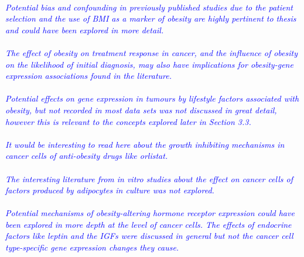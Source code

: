\documentclass[a4paper, 12pt]{article}
\begin{document}
\noindent
\\

\noindent
\textcolor{blue}{
	\textit{Potential bias and confounding in previously published studies due to the patient selection and the use of BMI as a marker of obesity are highly pertinent to thesis and could have been explored in more detail.
	}
}\\

\noindent
\\

\noindent
\textcolor{blue}{
	\textit{The effect of obesity on treatment response in cancer, and the influence of obesity on the likelihood of initial diagnosis, may also have implications for obesity-gene expression associations found in the literature.
	}
}\\

\noindent
\\

\noindent
\textcolor{blue}{
	\textit{Potential effects on gene expression in tumours by lifestyle factors associated with obesity, but not recorded in most data sets was not discussed in great detail, however this is relevant to the concepts explored later in Section 3.3.
	}
}\\

\noindent
\\

\noindent
\textcolor{blue}{
	\textit{It would be interesting to read here about the growth inhibiting mechanisms in cancer cells of anti-obesity drugs like orlistat.
	}
}\\

\noindent
\\

\noindent
\textcolor{blue}{
	\textit{The interesting literature from \textit{in vitro} studies about the effect on cancer cells of factors produced by adipocytes in culture was not explored.
	}
}\\

\noindent
\\

\noindent
\textcolor{blue}{
	\textit{Potential mechanisms of obesity-altering hormone receptor expression could have been explored in more depth \textit{at the level of cancer cells}.
	The effects of endocrine factors like leptin and the IGFs were discussed in general but not the cancer cell type-specific gene expression changes they cause.
	}
}\\

\noindent
\\
\end{document}
